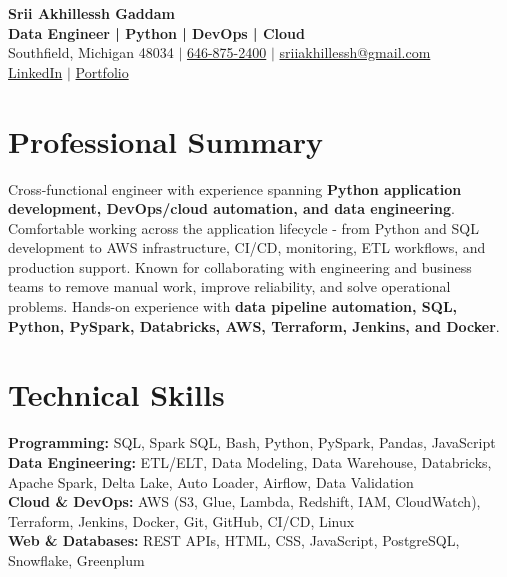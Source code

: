 \documentclass[letterpaper,10pt]{article}
\begin{document}
\fontsize{9.35pt}{10.45pt}\selectfont

\begin{center}
    {\LARGE \textbf{Srii Akhillessh Gaddam}} \\[-1pt]
    \textbf{Data Engineer | Python | DevOps | Cloud} \\[2pt]
    Southfield, Michigan 48034 $|$
    \href{tel:6468752400}{646-875-2400} $|$
    \href{mailto:sriiakhillessh@gmail.com}{sriiakhillessh@gmail.com} \\[1pt]
    \href{https://www.linkedin.com/in/srii-akhiilessh-gaddam-b48668191/}{LinkedIn} $|$
    \href{https://sriiakhillesshg.github.io/portfolio/}{Portfolio}
\end{center}
\vspace{-8pt}

\section{Professional Summary}
\small{Cross-functional engineer with experience spanning \textbf{Python application development, DevOps/cloud automation, and data engineering}. Comfortable working across the application lifecycle - from Python and SQL development to AWS infrastructure, CI/CD, monitoring, ETL workflows, and production support. Known for collaborating with engineering and business teams to remove manual work, improve reliability, and solve operational problems. Hands-on experience with \textbf{data pipeline automation, SQL, Python, PySpark, Databricks, AWS, Terraform, Jenkins, and Docker}.}

\section{Technical Skills}
\small{
\textbf{Programming:} SQL, Spark SQL, Bash, Python, PySpark, Pandas, JavaScript \\
\textbf{Data Engineering:} ETL/ELT, Data Modeling, Data Warehouse, Databricks, Apache Spark, Delta Lake, Auto Loader, Airflow, Data Validation \\
\textbf{Cloud \& DevOps:} AWS (S3, Glue, Lambda, Redshift, IAM, CloudWatch), Terraform, Jenkins, Docker, Git, GitHub, CI/CD, Linux \\
\textbf{Web \& Databases:} REST APIs, HTML, CSS, JavaScript, PostgreSQL, Snowflake, Greenplum
}
\end{document}
